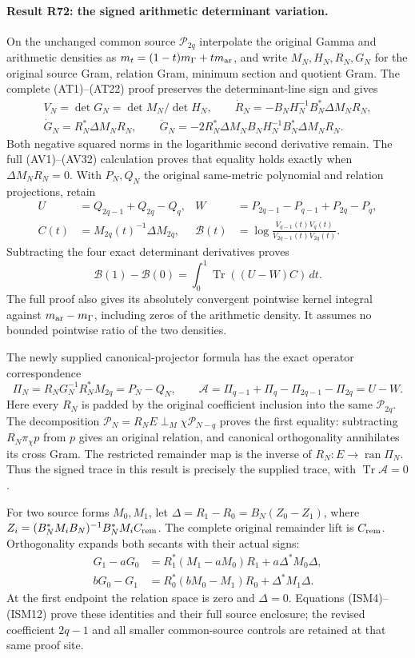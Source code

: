 \paragraph{Result R72: the signed arithmetic determinant variation.}
On the unchanged common source $\mathcal P_{2q}$ interpolate
the original Gamma and arithmetic densities as
$m_t=(1-t)m_\Gamma+tm_{\rm ar}$, and write $M_N,H_N,R_N,G_N$
for the original source Gram, relation Gram, minimum section
and quotient Gram. The complete (AT1)--(AT22) proof preserves
the determinant-line sign and gives
\[
\begin{gathered}
V_N=\det G_N=\det M_N/\det H_N,\qquad
\dot R_N=-B_NH_N^{-1}B_N^*\Delta M_NR_N,\\
\dot G_N=R_N^*\Delta M_NR_N,\qquad
\ddot G_N=-2R_N^*\Delta M_NB_NH_N^{-1}B_N^*\Delta M_NR_N.
\end{gathered}
\]
Both negative squared norms in the logarithmic second
derivative remain. The full (AV1)--(AV32) calculation proves
that equality holds exactly when $\Delta M_NR_N=0$.
With $P_N,Q_N$ the original same-metric polynomial and
relation projections, retain
\[
\begin{aligned}
U&=Q_{2q-1}+Q_{2q}-Q_q,&
W&=P_{2q-1}-P_{q-1}+P_{2q}-P_q,\\
C(t)&=M_{2q}(t)^{-1}\Delta M_{2q},&
\mathcal B(t)&=\log\frac{V_{q-1}(t)V_q(t)}{V_{2q-1}(t)V_{2q}(t)}.
\end{aligned}
\]
Subtracting the four exact determinant derivatives proves
\[
\mathcal B(1)-\mathcal B(0)=\int_0^1\operatorname{Tr}((U-W)C)\,dt.
\]
The full proof also gives its absolutely convergent
pointwise kernel integral against $m_{\rm ar}-m_\Gamma$,
including zeros of the arithmetic density. It assumes
no bounded pointwise ratio of the two densities.


The newly supplied canonical-projector formula has the exact
operator correspondence
\[
 \Pi_N=R_NG_N^{-1}R_N^*M_{2q}=P_N-Q_N,\qquad
 \mathcal A=\Pi_{q-1}+\Pi_q-\Pi_{2q-1}-\Pi_{2q}=U-W .
\]
Here every \(R_N\) is padded by the original coefficient
inclusion into the same \(\mathcal P_{2q}\).  The decomposition
\(\mathcal P_N=R_NE\perp_M\chi\mathcal P_{N-q}\) proves the
first equality: subtracting \(R_N\pi_\chi p\) from \(p\)
gives an original relation, and canonical orthogonality
annihilates its cross Gram.  The restricted remainder map
is the inverse of \(R_N:E\to\operatorname{ran}\Pi_N\).
Thus the signed trace in this result is precisely the
supplied trace, with \(\operatorname{Tr}\mathcal A=0\).

For two source forms \(M_0,M_1\), let
\(\Delta=R_1-R_0=B_N(Z_0-Z_1)\), where
\(Z_i=(B_N^*M_iB_N)^{-1}B_N^*M_iC_{\rm rem}\).
The complete original remainder lift is \(C_{\rm rem}\).
Orthogonality expands both secants with their actual signs:
\[
 \begin{split}
 G_1-aG_0&=R_1^*(M_1-aM_0)R_1+a\Delta^*M_0\Delta,\\
 bG_0-G_1&=R_0^*(bM_0-M_1)R_0+\Delta^*M_1\Delta.
 \end{split}
\]
At the first endpoint the relation space is zero and
\(\Delta=0\).  Equations (ISM4)--(ISM12) prove these
identities and their full source enclosure; the revised
coefficient \(2q-1\) and all smaller common-source controls
are retained at that same proof site.

